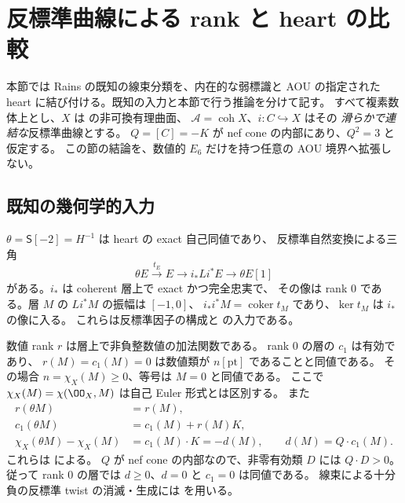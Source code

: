 \section{反標準曲線による rank と heart の比較}\label{sec:anticanonical-heart-bridge}
本節では Rains の既知の線束分類を、内在的な弱標識と AOU の指定された
heart に結び付ける。既知の入力と本節で行う推論を分けて記す。
すべて複素数体上とし、$X$ は \cite{RainsBir} の非可換有理曲面、
$\mathcal A=\operatorname{coh}X$、$i:C\hookrightarrow X$ はその
\emph{滑らかで連結な}反標準曲線とする。
$Q=[C]=-K$ が nef cone の内部にあり、$Q^2=3$ と仮定する。
この節の結論を、数値的 $E_6$ だけを持つ任意の AOU 境界へ拡張しない。

\subsection{既知の幾何学的入力}
$\theta=\mathsf S[-2]=H^{-1}$ は heart の exact 自己同値であり、
反標準自然変換による三角
\begin{equation}\label{eq:anticanonical-cartier-triangle}
 \theta E\xrightarrow{t_E}E\longrightarrow i_*Li^*E\longrightarrow\theta E[1]
\end{equation}
がある。$i_*$ は coherent 層上で exact かつ完全忠実で、
その像は rank $0$ である。層 $M$ の $Li^*M$ の振幅は $[-1,0]$、
$i_*i^*M=\operatorname{coker}t_M$ であり、$\ker t_M$ は $i_*$ の像に入る。
これらは反標準因子の構成と \cite[\S7 冒頭]{RainsBir} の入力である。

数値 rank $r$ は層上で非負整数値の加法関数である。
rank $0$ の層の $c_1$ は有効であり、
$r(M)=c_1(M)=0$ は数値類が $n[\mathrm{pt}]$ であることと同値である。
その場合 $n=\chi_X(M)\ge0$、等号は $M=0$ と同値である。
ここで $\chi_X(M)=\chi(\OO_X,M)$ は自己 Euler 形式とは区別する。
また
\begin{equation}\label{eq:theta-rank-degree-identities}
 \begin{split}
 r(\theta M)&=r(M),\\
 c_1(\theta M)&=c_1(M)+r(M)K,\\
 \chi_X(\theta M)-\chi_X(M)&=c_1(M)\cdot K=-d(M),
 \qquad d(M)=Q\cdot c_1(M).
 \end{split}
\end{equation}
これらは \cite[Definition 7.1, Propositions 7.5--7.6,
Corollary 7.15, Proposition 7.19]{RainsBir} による。
$Q$ が nef cone の内部なので、非零有効類 $D$ には $Q\cdot D>0$。
従って rank $0$ の層では $d\ge0$、$d=0$ と $c_1=0$ は同値である。
線束による十分負の反標準 twist の消滅・生成には
\cite[Theorem 9.10]{RainsBir}を用いる。

